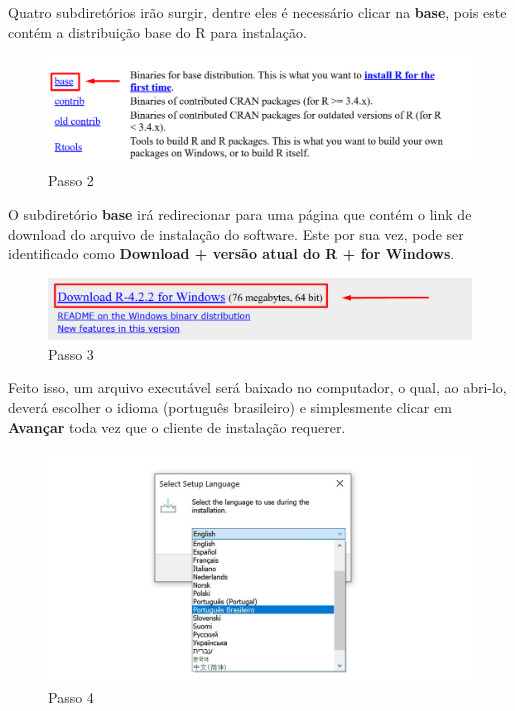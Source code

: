 \documentclass[
  letterpaper,
  DIV=11,
  numbers=noendperiod]{scrreprt}
\begin{document}
Quatro subdiretórios irão surgir, dentre eles é necessário clicar na
\textbf{base}, pois este contém a distribuição base do R para
instalação.

\begin{figure}

{\centering \includegraphics[width=1\textwidth,height=\textheight]{./figuras_tutorialR/install_Windows1.png}

}

\caption{Passo 2}

\end{figure}

O subdiretório \textbf{base} irá redirecionar para uma página que contém
o link de download do arquivo de instalação do software. Este por sua
vez, pode ser identificado como \textbf{Download + versão atual do R +
for Windows}.

\begin{figure}

{\centering \includegraphics[width=1\textwidth,height=\textheight]{./figuras_tutorialR/install_Windows2.png}

}

\caption{Passo 3}

\end{figure}

Feito isso, um arquivo executável será baixado no computador, o qual, ao
abri-lo, deverá escolher o idioma (português brasileiro) e simplesmente
clicar em \textbf{Avançar} toda vez que o cliente de instalação
requerer.

\begin{figure}

{\centering \includegraphics[width=1\textwidth,height=\textheight]{./figuras_tutorialR/install_Windows3.jpg}

}

\caption{Passo 4}

\end{figure}
\end{document}
